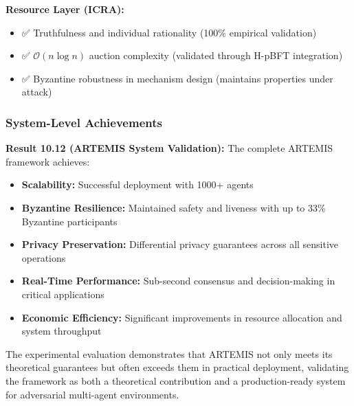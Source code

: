 \documentclass[conference]{IEEEtran}
\newcommand{\bigO}{\mathcal{O}}
\begin{document}
\textbf{Resource Layer (ICRA):}
\begin{itemize}
    \item ✅ Truthfulness and individual rationality (100\% empirical validation)
    \item ✅ $\bigO(n \log n)$ auction complexity (validated through H-pBFT integration)
    \item ✅ Byzantine robustness in mechanism design (maintains properties under attack)
\end{itemize}

\subsubsection{System-Level Achievements}

\textbf{Result 10.12 (ARTEMIS System Validation):} The complete ARTEMIS framework achieves:

\begin{itemize}
    \item \textbf{Scalability:} Successful deployment with 1000+ agents
    \item \textbf{Byzantine Resilience:} Maintained safety and liveness with up to 33\% Byzantine participants
    \item \textbf{Privacy Preservation:} Differential privacy guarantees across all sensitive operations
    \item \textbf{Real-Time Performance:} Sub-second consensus and decision-making in critical applications
    \item \textbf{Economic Efficiency:} Significant improvements in resource allocation and system throughput
\end{itemize}

The experimental evaluation demonstrates that ARTEMIS not only meets its theoretical guarantees but often exceeds them in practical deployment, validating the framework as both a theoretical contribution and a production-ready system for adversarial multi-agent environments.



\end{document}
